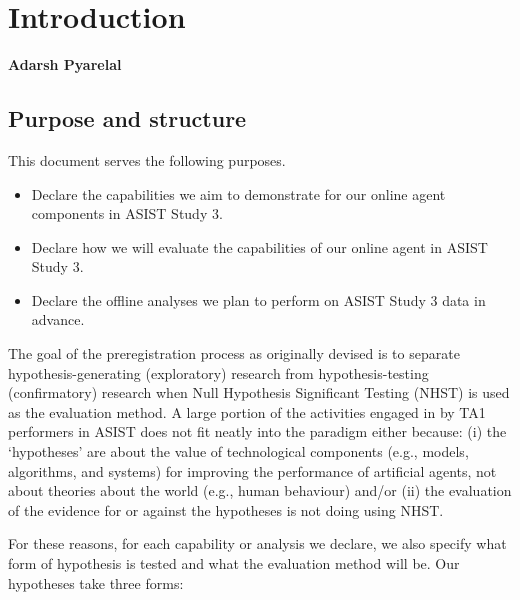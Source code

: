 \chapter{Introduction}
\textbf{Adarsh Pyarelal}

\section{Purpose and structure}

This document serves the following purposes.

\begin{itemize}
    \item Declare the capabilities we aim to demonstrate for our online agent
        components in ASIST Study 3.
    \item Declare how we will evaluate the capabilities of our online agent in
        ASIST Study 3.
    \item Declare the offline analyses we plan to perform on ASIST Study 3 data
        in advance.
\end{itemize}


The goal of the preregistration process as originally devised
\citep{Nosek.ea:2018} is to separate hypothesis-generating (exploratory)
research from hypothesis-testing (confirmatory) research when Null Hypothesis
Significant Testing (NHST) is used as the evaluation method. A large portion of
the activities engaged in by TA1 performers in ASIST does not fit neatly into
the paradigm either because: (i) the `hypotheses' are about the value of
technological components (e.g., models, algorithms, and systems) for improving
the performance of artificial agents, not about theories about the world (e.g.,
human behaviour) and/or (ii) the evaluation of the evidence for or against the
hypotheses is not doing using NHST.

For these reasons, for each capability or analysis we declare, we also specify
what form of hypothesis is tested and what the evaluation method will be. Our
hypotheses take three forms:

